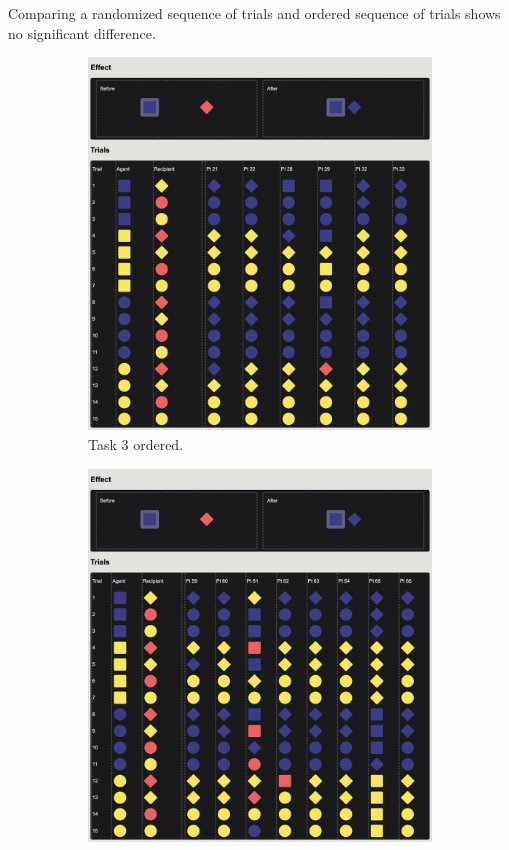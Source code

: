 \documentclass{article}
\begin{document}
Comparing a randomized sequence of trials and ordered sequence of trials shows no significant difference.

\begin{figure}[h!]
  \centering
  \begin{subfigure}[t]{0.45\textwidth}
    \centering
    \includegraphics[width=\linewidth]{raw_g3} 
    \caption{Task 3 ordered.} \label{fig:raw_g3_ordered}
  \end{subfigure}
  \hfil
  \begin{subfigure}[t]{0.45\textwidth}
    \centering
    \includegraphics[width=\linewidth]{random} 

\end{subfigure}
\end{figure}
\end{document}
